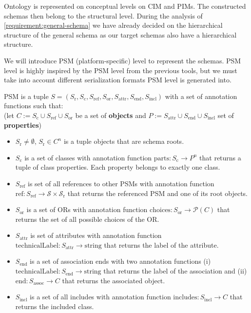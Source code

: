 Ontology is represented on conceptual levels on CIM and PIMs. The constructed schemas then belong to the structural level. During the analysis of \autoref{requirement:general-schema} we have already decided on the hierarchical structure of the general schema as our target schemas also have a hierarchical structure.

We will introduce PSM (platform-specific) level to represent the schemas. PSM level is highly inspired by the PSM level from the previous tools, but we must take into account different serialization formats PSM level is generated into.

\begin{definition}[PSM]
    PSM is a tuple $S=(S_{\textrm{r}}, S_{\textrm{c}}, S_{\textrm{ref}}, S_{\textrm{or}}, S_{\textrm{attr}}, S_{\textrm{end}}, S_{\textrm{incl}})$ with a set of annotation functions such that:
    \\(let $C:=S_{\textrm{c}}\cup S_{\textrm{ref}}\cup S_{\textrm{or}}$ be a set of \textbf{objects} and $P:=S_{\textrm{attr}}\cup S_{\textrm{end}}\cup S_{\textrm{incl}}$ set of \textbf{properties})
    \begin{itemize}
        \item $S_{\textrm{r}} \neq \emptyset$, $S_{\textrm{r}} \in C^n$ is a tuple objects that are schema roots.

        \item $S_{\textrm{c}}$ is a set of classes with annotation function $\textrm{parts}: S_{\textrm{c}} \rightarrow P^n$ that returns a tuple of class properties. Each property belongs to exactly one class.

        \item $S_{\textrm{ref}}$ is set of all references to other PSMs with annotation function $\textrm{ref}: S_{\textrm{ref}} \rightarrow \mathcal{S} \times \mathcal{S}_{\textrm{r}}$ that returns the referenced PSM and one of its root objects.

        \item $S_{\textrm{or}}$ is a set of ORs with annotation function $\textrm{choices}: S_{\textrm{or}} \rightarrow \mathcal{P}(C)$ that returns the set of all possible choices of the OR.

        \item $S_{\textrm{attr}}$ is set of attributes with annotation function $\textrm{technicalLabel}: S_{\textrm{attr}} \rightarrow \textrm{string}$ that returns the label of the attribute.

        \item $S_{\textrm{end}}$ is a set of association ends with two annotation functions (i)\\$\textrm{technicalLabel}: S_{\textrm{end}} \rightarrow \textrm{string}$ that returns the label of the association and (ii) $\textrm{end}: S_{\textrm{assoc}} \rightarrow C$ that returns the associated object.

        \item $S_{\textrm{incl}}$ is a set of all includes with annotation function $\textrm{includes}: S_{\textrm{incl}} \rightarrow C$ that returns the included class.
    \end{itemize}
\end{definition}


